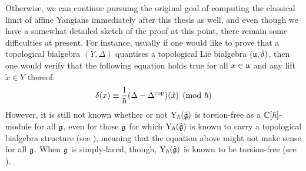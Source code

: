         Otherwise, we can continue pursuing the original goal of computing the classical limit of affine Yangians immediately after this thesis as well, and even though we have a somewhat detailed sketch of the proof at this point, there remain some difficulties at present. For instance, usually if one would like to prove that a topological bialgebra $(Y, \Delta)$ quantises a topological Lie bialgebra $(\mathfrak{u}, \delta)$, then one would verify that the following equation holds true for all $x \in \mathfrak{u}$ and any lift $\tilde{x} \in Y$ thereof:
            $$\delta(x) \equiv \frac{1}{\hbar}(\Delta - \Delta^{\mathrm{cop}})(\tilde{x}) \pmod{\hbar}$$
        However, it is still not known whether or not $\mathrm{Y}_{\hbar}(\hat{\mathfrak{g}})$ is torsion-free as a $\mathbb{C}[\hbar]$-module for all $\mathfrak{g}$, even for those $\mathfrak{g}$ for which $\mathrm{Y}_{\hbar}(\hat{\mathfrak{g}})$ is known to carry a topological bialgebra structure (see \cite[Section 5]{guay_nakajima_wendlandt_affine_yangian_coproduct}), meaning that the equation above might not make sense for all $\mathfrak{g}$. When $\mathfrak{g}$ is simply-laced, though, $\mathrm{Y}_{\hbar}(\hat{\mathfrak{g}})$ is known to be torsion-free (see \cite[Section 6]{guay_regelskis_wendlandt_affine_yangian_vertex_representations_and_PBW}).